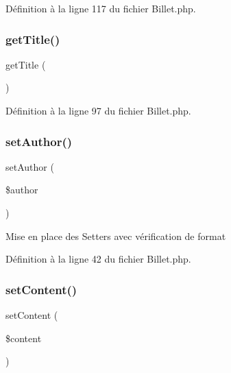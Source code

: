 Définition à la ligne 117 du fichier Billet.\+php.

\mbox{\label{class_src_1_1_entity_1_1_billet_a95e859a4588a39a1824b717378a84c29}} 
\subsubsection{\texorpdfstring{get\+Title()}{getTitle()}}
{\footnotesize\ttfamily get\+Title (\begin{DoxyParamCaption}{ }\end{DoxyParamCaption})}



Définition à la ligne 97 du fichier Billet.\+php.

\mbox{\label{class_src_1_1_entity_1_1_billet_afde85a369fc83b442db3cf5c6ac31d4a}} 
\subsubsection{\texorpdfstring{set\+Author()}{setAuthor()}}
{\footnotesize\ttfamily set\+Author (\begin{DoxyParamCaption}\item[{}]{\$author }\end{DoxyParamCaption})}

Mise en place des Setters avec vérification de format 

Définition à la ligne 42 du fichier Billet.\+php.

\mbox{\label{class_src_1_1_entity_1_1_billet_a04a5eddb7c3abc7bf31fa25b58f046bf}} 
\subsubsection{\texorpdfstring{set\+Content()}{setContent()}}
{\footnotesize\ttfamily set\+Content (\begin{DoxyParamCaption}\item[{}]{\$content }\end{DoxyParamCaption})}




